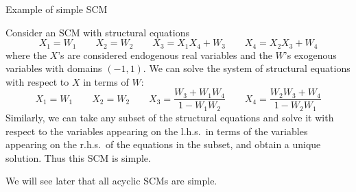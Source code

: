 \begin{frame}{Example of simple SCM}
\begin{Eg}[\ref{eg:simple_scm}]
Consider an SCM with structural equations
$$X_1 = W_1 \qquad X_2 = W_2 \qquad X_3 = X_1 X_4 + W_3 \qquad X_4 = X_2 X_3 + W_4 $$
where the $X$'s are considered endogenous real variables and the $W$'s exogenous variables with domains $(-1,1)$.
We can solve the system of structural equations with respect to $X$ in terms of $W$:
$$X_1 = W_1 \qquad X_2 = W_2 \qquad X_3 = \frac{W_3 + W_1 W_4}{1 - W_1 W_2} \qquad X_4 = \frac{W_2 W_3 + W_4}{1 - W_2 W_1}$$
Similarly, we can take any subset of the structural equations and solve it with respect to the variables appearing on the l.h.s.\ in terms of the variables appearing on the r.h.s.\ of the equations in the subset, and obtain a unique solution. Thus this SCM is simple.
\end{Eg}
We will see later that all acyclic SCMs are simple.
\end{frame}



